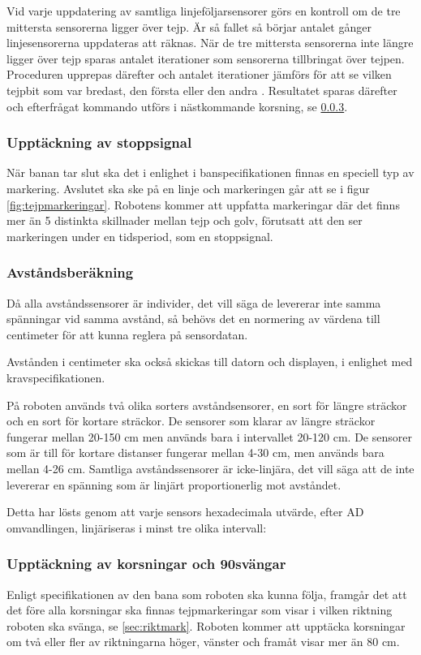 Vid varje uppdatering av samtliga linjeföljarsensorer görs en kontroll om de 
tre mittersta sensorerna ligger över tejp. Är så fallet så börjar antalet 
gånger linjesensorerna uppdateras att räknas. När de tre mittersta sensorerna 
inte längre ligger över tejp sparas antalet iterationer som sensorerna 
tillbringat över tejpen. Proceduren upprepas därefter och antalet iterationer 
jämförs för att se vilken tejpbit som var bredast, den första eller den andra
. Resultatet sparas därefter och efterfrågat kommando utförs i nästkommande 
korsning, se \ref{sec:upptackkorsning}.

\subsubsection{Upptäckning av stoppsignal}
När banan tar slut ska det i enlighet i banspecifikationen finnas en speciell typ av 
markering. Avslutet ska ske på en linje och markeringen går att se i figur \ref{fig:tejpmarkeringar}.
Robotens kommer att uppfatta markeringar där det finns mer än 5 distinkta skillnader mellan tejp och golv, förutsatt att den ser markeringen under en tidsperiod, som en stoppsignal. 

\subsubsection{Avståndsberäkning}
Då alla avståndssensorer är individer, det vill säga de levererar inte samma spänningar vid
samma avstånd, så behövs det en normering av värdena till centimeter för att kunna reglera
på sensordatan. 

Avstånden i centimeter ska också skickas till datorn och displayen, i enlighet med
kravspecifikationen.

På roboten används två olika sorters avståndsensorer, en sort för längre sträckor och en sort för
kortare sträckor. De sensorer som klarar av längre sträckor fungerar mellan 20-150 cm men 
används bara i intervallet 20-120 cm. De sensorer som är till för kortare distanser fungerar mellan 4-30 cm,
 men används bara mellan 4-26 cm. Samtliga avståndssensorer är icke-linjära, det vill säga att de 
 inte levererar en spänning som är linjärt proportionerlig mot avståndet.

Detta har lösts genom att varje sensors hexadecimala utvärde, efter AD omvandlingen, linjäriseras i minst 
tre olika intervall:

\subsubsection{Upptäckning av korsningar och 90\degree svängar}
\label{sec:upptackkorsning}
Enligt specifikationen av den bana som roboten ska kunna följa, framgår det 
att det före alla korsningar ska finnas tejpmarkeringar som visar i vilken 
riktning roboten ska svänga, se \ref{sec:riktmark}. Roboten kommer att 
upptäcka korsningar om två eller fler av riktningarna höger, vänster och framåt visar 
mer än 80 cm.


